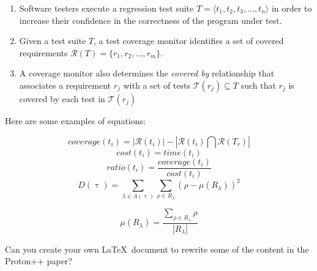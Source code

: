 \documentclass[11pt]{article}
\begin{document}
\begin{enumerate}

\item Software testers execute a regression test suite $T=\langle t_1,
  t_2, t_3, \ldots, t_n \rangle$ in order to increase their confidence
  in the correctness of the program under test.

\item Given a test suite $T$, a test coverage monitor identifies a set
  of covered requirements $\mathcal{R}$$(T) = \{ r_1, r_2, \ldots, r_m
  \}$.

\item A coverage monitor also determines the \textit{covered by}
relationship that associates a requirement $r_j$ with a set of tests
$\mathcal{T}$$(r_j) \subseteq T$ such that $r_j$ is covered by each
test in $\mathcal{T}(r_j)$

\end{enumerate}

Here are some examples of equations:

\begin{equation}
 coverage(t_i) = |\mathcal{R}(t_i)| - |\mathcal{R}(t_i) \bigcap
 \mathcal{R}(T_r)|
\label{eq:cov}
\end{equation}
\vspace{-12pt}
\begin{equation}
 cost(t_i) = time(t_i)
\label{eq:cost}
\end{equation}
\vspace{-12pt}
\begin{equation}
 ratio(t_i) = \frac{coverage(t_i)}{cost(t_i)}
\label{eq:ratio}
\end{equation}
\begin{equation}
D(\uptau) = \sum_{\lambda \in \Lambda(\uptau)}\sum_{\rho \in R_\lambda}
\left( \rho - \mu(R_\lambda) \right)^2 
\label{eq:deviance}
\end{equation}

\begin{equation}
\mu(R_\lambda) = \frac{\displaystyle{\sum_{\rho \in R_\lambda}} \rho}
                {|R_\lambda|} 
\label{eq:deviancemean}
\end{equation}

Can you create your own \LaTeX~document to rewrite some of the content in the Proton++ paper?
\end{document}
